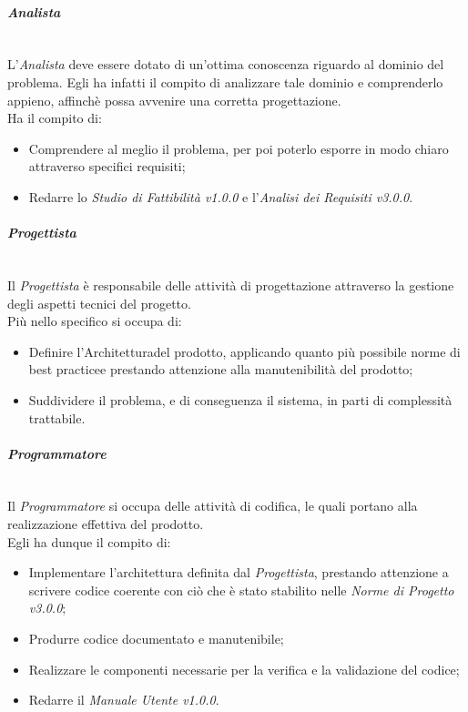 \paragraph{\textit{Analista}} ~\\
	L'\textit{Analista} deve essere dotato di un'ottima conoscenza riguardo al dominio del problema. Egli ha infatti il 					compito di analizzare tale dominio e comprenderlo appieno, affinchè possa avvenire una corretta 											progettazione\glossario.\\
	Ha il compito di:
	\begin{itemize}
	\item Comprendere al meglio il problema, per poi poterlo esporre in modo chiaro attraverso specifici 									requisiti\glossario;
	\item Redarre lo \textit{Studio di Fattibilità v1.0.0} e l'\textit{Analisi dei Requisiti v3.0.0}.
	\end{itemize}

\paragraph{\textit{Progettista}} ~\\
	Il \textit{Progettista} è responsabile delle attività di progettazione attraverso la gestione degli aspetti tecnici 	del progetto.\\
	Più nello specifico si occupa di:
	\begin{itemize}
	\item Definire l'Architettura\glossario del prodotto\glossario, applicando quanto più possibile norme di 							best practice\glossario e prestando attenzione alla manutenibilità del prodotto;
	\item Suddividere il problema, e di conseguenza il sistema, in parti di complessità trattabile.
	\end{itemize}

\paragraph{\textit{Programmatore}} ~\\
	Il \textit{Programmatore} si occupa delle attività di codifica, le quali portano alla realizzazione effettiva del 						prodotto.\\
	Egli ha dunque il compito di:
	\begin{itemize}
	\item Implementare l'architettura definita dal \textit{Progettista}, prestando attenzione a scrivere codice 						coerente con ciò che è stato stabilito nelle \textit{Norme di Progetto v3.0.0};
	\item Produrre codice documentato e manutenibile;
	\item Realizzare le componenti necessarie per la verifica e la validazione del codice;
	\item Redarre il \textit{Manuale Utente v1.0.0}.
	\end{itemize}

